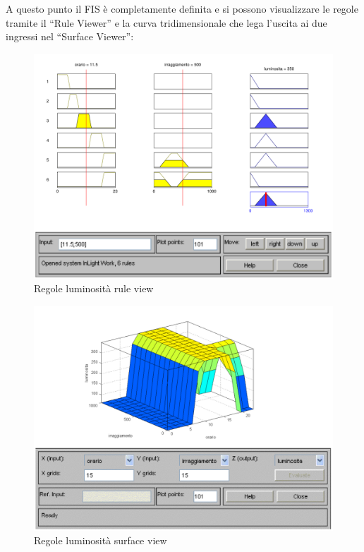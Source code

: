 A questo punto il FIS è completamente definita e si possono visualizzare le regole tramite il “Rule Viewer” e la curva tridimensionale che lega l'uscita ai due ingressi nel “Surface Viewer”:

\begin{figure}[htbp]
  \centering
  \includegraphics[scale=0.5]{images/fuzzy/regole_luminosita_rule_view.pdf}
  \caption{Regole luminosità rule view}
\end{figure}
\begin{figure}[htbp]
  \centering
  \includegraphics[scale=0.5]{images/fuzzy/regole_luminosita_surface_view.pdf}
  \caption{Regole luminosità surface view}
\end{figure}


